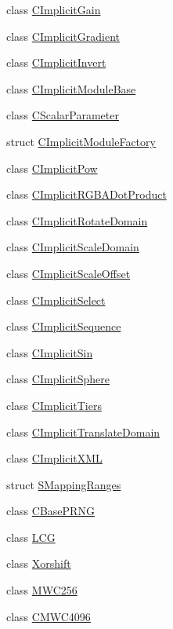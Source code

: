 \begin{DoxyCompactItemize}
class \hyperlink{classanl_1_1CImplicitGain}{CImplicitGain}
\item 
class \hyperlink{classanl_1_1CImplicitGradient}{CImplicitGradient}
\item 
class \hyperlink{classanl_1_1CImplicitInvert}{CImplicitInvert}
\item 
class \hyperlink{classanl_1_1CImplicitModuleBase}{CImplicitModuleBase}
\item 
class \hyperlink{classanl_1_1CScalarParameter}{CScalarParameter}
\item 
struct \hyperlink{structanl_1_1CImplicitModuleFactory}{CImplicitModuleFactory}
\item 
class \hyperlink{classanl_1_1CImplicitPow}{CImplicitPow}
\item 
class \hyperlink{classanl_1_1CImplicitRGBADotProduct}{CImplicitRGBADotProduct}
\item 
class \hyperlink{classanl_1_1CImplicitRotateDomain}{CImplicitRotateDomain}
\item 
class \hyperlink{classanl_1_1CImplicitScaleDomain}{CImplicitScaleDomain}
\item 
class \hyperlink{classanl_1_1CImplicitScaleOffset}{CImplicitScaleOffset}
\item 
class \hyperlink{classanl_1_1CImplicitSelect}{CImplicitSelect}
\item 
class \hyperlink{classanl_1_1CImplicitSequence}{CImplicitSequence}
\item 
class \hyperlink{classanl_1_1CImplicitSin}{CImplicitSin}
\item 
class \hyperlink{classanl_1_1CImplicitSphere}{CImplicitSphere}
\item 
class \hyperlink{classanl_1_1CImplicitTiers}{CImplicitTiers}
\item 
class \hyperlink{classanl_1_1CImplicitTranslateDomain}{CImplicitTranslateDomain}
\item 
class \hyperlink{classanl_1_1CImplicitXML}{CImplicitXML}
\item 
struct \hyperlink{structanl_1_1SMappingRanges}{SMappingRanges}
\item 
class \hyperlink{classanl_1_1CBasePRNG}{CBasePRNG}
\item 
class \hyperlink{classanl_1_1LCG}{LCG}
\item 
class \hyperlink{classanl_1_1Xorshift}{Xorshift}
\item 
class \hyperlink{classanl_1_1MWC256}{MWC256}
\item 
class \hyperlink{classanl_1_1CMWC4096}{CMWC4096}
\item 

\end{DoxyCompactItemize}
